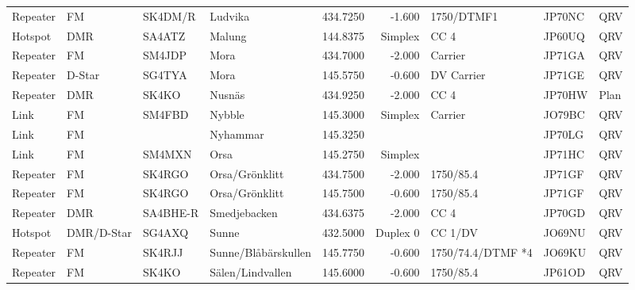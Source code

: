 {\begin{landscape}
\begin{longtable}{llllrrlll}
	Repeater              & FM         & SK4DM/R  & Ludvika                &     434.7250 &     -1.600 & 1750/DTMF1        & JP70NC      & QRV      \\
	Hotspot               & DMR        & SA4ATZ   & Malung                 &     144.8375 &    Simplex & CC 4              & JP60UQ      & QRV      \\
	Repeater              & FM         & SM4JDP   & Mora                   &     434.7000 &     -2.000 & Carrier           & JP71GA      & QRV      \\
	Repeater              & D-Star     & SG4TYA   & Mora                   &     145.5750 &     -0.600 & DV Carrier        & JP71GE      & QRV      \\
	Repeater              & DMR        & SK4KO    & Nusnäs                 &     434.9250 &     -2.000 & CC 4              & JP70HW      & Plan     \\
	Link                  & FM         & SM4FBD   & Nybble                 &     145.3000 &    Simplex & Carrier           & JO79BC      & QRV      \\
	Link                  & FM         &          & Nyhammar               &     145.3250 &            &                   & JP70LG      & QRV      \\
	Link                  & FM         & SM4MXN   & Orsa                   &     145.2750 &    Simplex &                   & JP71HC      & QRV      \\
	Repeater              & FM         & SK4RGO   & Orsa/Grönklitt         &     434.7500 &     -2.000 & 1750/85.4         & JP71GF      & QRV      \\
	Repeater              & FM         & SK4RGO   & Orsa/Grönklitt         &     145.7500 &     -0.600 & 1750/85.4         & JP71GF      & QRV      \\
	Repeater              & DMR        & SA4BHE-R & Smedjebacken           &     434.6375 &     -2.000 & CC 4              & JP70GD      & QRV      \\
	Hotspot               & DMR/D-Star & SG4AXQ   & Sunne                  &     432.5000 &   Duplex 0 & CC 1/DV           & JO69NU      & QRV      \\
	Repeater              & FM         & SK4RJJ   & Sunne/Blåbärskullen    &     145.7750 &     -0.600 & 1750/74.4/DTMF *4 & JO69KU      & QRV      \\
	Repeater              & FM         & SK4KO    & Sälen/Lindvallen       &     145.6000 &     -0.600 & 1750/85.4         & JP61OD      & QRV      \\

\end{longtable}
\end{landscape}}
